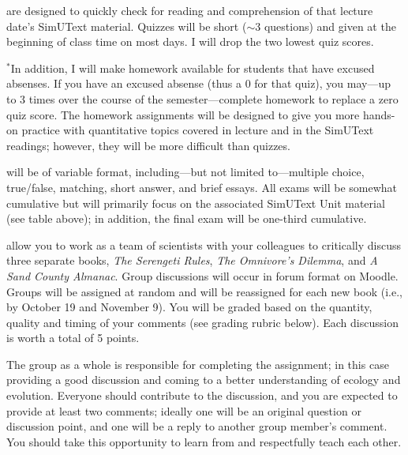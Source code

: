 \documentclass{tufte-handout}
\begin{document}
\begin{fullwidth}	

 are designed to quickly check for reading and comprehension of that lecture date's SimUText material. Quizzes will be short ($\sim$3 questions) and given at the beginning of class time on most days. I will drop the two lowest quiz scores.

$^*$In addition, I will make homework available for students that have excused absenses. If you have an excused absense (thus a 0 for that quiz), you may---up to 3 times over the course of the semester---complete homework to replace a zero quiz score. The homework assignments will be designed to give you more hands-on practice with quantitative topics covered in lecture and in the SimUText readings; however, they will be more difficult than quizzes.
	
\newpage 

 will be of variable format, including---but not limited to---multiple choice, true/false, matching, short answer, and brief essays. All exams will be somewhat cumulative but will primarily focus on the associated SimUText Unit material (see table above); in addition, the final exam will be one-third cumulative. 
					
												
 allow you to work as a team of scientists with your colleagues to critically discuss three separate books, \emph{The Serengeti Rules}, \emph{The Omnivore's Dilemma}, and \emph{A Sand County Almanac}. Group discussions will occur in forum format on Moodle. Groups will be assigned at random and will be reassigned for each new book 
(i.e., by October 19 and November 9). 											%
You will be graded based on the quantity, quality and timing of your comments (see grading rubric below). Each discussion is worth a total of 5 points.

The group as a whole is responsible for completing the assignment; in this case providing a good discussion and coming to a better understanding of ecology and evolution. Everyone should contribute to the discussion, and you are expected to provide at least two comments; ideally one will be an original question or discussion point, and one will be a reply to another group member's comment. You should take this opportunity to learn from and respectfully teach each other.


\end{fullwidth}
\end{document}
